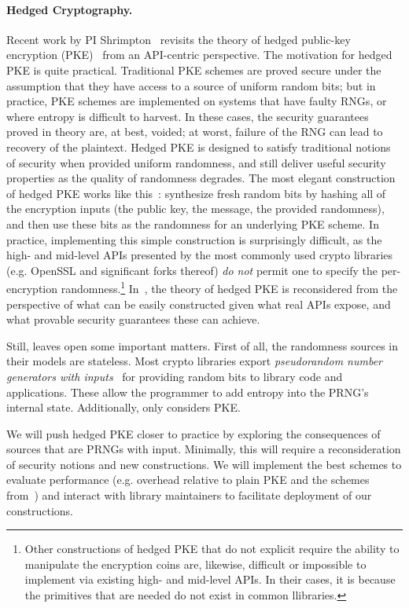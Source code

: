 \paragraph{Hedged Cryptography. }
Recent work by PI Shrimpton~\cite{BPS} revisits the theory of
hedged public-key encryption (PKE)~\cite{BBN+} from an API-centric perspective.
%
The motivation for hedged PKE is quite practical. Traditional
PKE schemes are proved secure under the assumption that they have access to a
source of uniform random bits; but in practice, PKE schemes are implemented on
systems that have faulty RNGs, or where entropy is difficult to harvest.  In
these cases, the security guarantees proved in theory are, at best, voided; at
worst, failure of the RNG can lead to recovery of the plaintext.
%
Hedged PKE is designed to satisfy traditional notions of security when provided
uniform randomness, and still deliver useful security properties as the quality
of randomness degrades.  The most elegant construction of hedged PKE works like
this~\cite{BBN+,BH15}: synthesize fresh random bits by hashing all of the
encryption inputs (the public key, the message, the provided randomness), and
then use these bits as the randomness for an underlying PKE scheme.  In
practice, implementing this simple construction is surprisingly difficult, as
the high- and mid-level APIs presented by the most commonly used crypto
libraries (e.g. OpenSSL and significant forks thereof) \emph{do not} permit one
to specify the per-encryption randomness.\footnote{Other constructions of hedged PKE that do not explicit require the
ability to manipulate the encryption coins are, likewise, difficult or
impossible to implement via existing high- and mid-level APIs.  In
their cases, it is because the primitives that are needed do not exist
in common llibraries.}  
In~\cite{BPS}, the theory of hedged
PKE is reconsidered from the perspective of what can be easily constructed given
what real APIs expose, and what provable security guarantees these can achieve.

Still, \cite{BPS} leaves open some important matters.  First of all,
the randomness sources in their models are stateless. 
Most crypto libraries export \emph{pseudorandom number generators with
  inputs}~\cite{BH05,ST15} for providing random bits to library code and
  applications. These allow the programmer to add entropy into the PRNG's
  internal state.  
Additionally, \cite{BPS} only considers PKE.


\begin{task}
We will push hedged PKE closer to practice by exploring the
consequences of sources that are PRNGs with input.  Minimally, this will require
a reconsideration of security notions and new constructions.  We will
implement the best schemes to evaluate performance (e.g. overhead
relative to plain PKE and the schemes from~\cite{BPS}) and interact
with library maintainers to facilitate deployment of our constructions.
\end{task}

